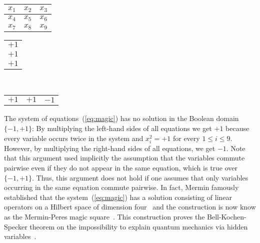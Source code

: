 \documentclass[11pt,letter]{article}
\begin{document}
\begin{center}
{\large
\begin{tabular}{|c|c|c|}
 \hline
  $x_1$ & $x_2$ & $x_3$ \\\hline 
  $x_4$ & $x_5$ & $x_6$ \\\hline 
  $x_7$ & $x_8$ & $x_9$ \\\hline
\end{tabular}
}
\begin{tabular}{c}
    $+1$\\
    $+1$\\
    $+1$
\end{tabular}
\\[-0.7em]
\begin{tabular}{ccc}
  $+1$ & $+1$ & $-1$
\end{tabular}
\end{center}
\vspace*{-1.2em}
The system of equations~(\ref{eq:magic}) has no solution in the Boolean domain
$\{-1,+1\}$: By multiplying the left-hand sides of all equations we get $+1$
because every variable occurs twice in the system and $x_i^2=+1$ for every
$1\leq i\leq 9$. However, by multiplying the right-hand sides of all equations,
we get $-1$. Note that this argument used implicitly the assumption that the
variables commute pairwise even if they do not appear in the same equation,
which is true over $\{-1,+1\}$.
Thus, this argument does not hold if one assumes that 
only variables occurring
in the same equation commute pairwise. In fact, Mermin famously established that
the system~(\ref{eq:magic}) has a solution consisting of linear operators on a
Hilbert space of dimension four~\cite{Mermin1990simple,Mermin1993hidden} and the
construction is now know as the Mermin-Peres magic
square~\cite{Peres1990incompatible}. This construction proves the
Bell-Kochen-Specker theorem on the impossibility to explain quantum
mechanics via hidden variables~\cite{Bell1966problem,Kochen67}. 
\end{document}
